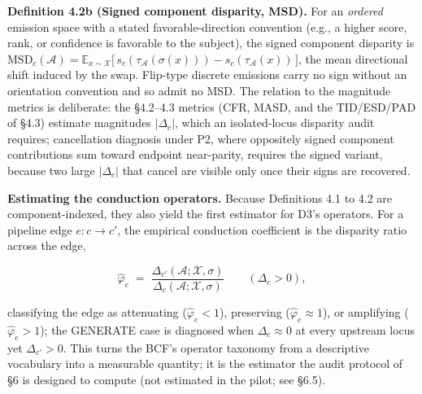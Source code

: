 \documentclass[acmsmall,nonacm]{acmart}
\begin{document}
\textbf{Definition 4.2b (Signed component disparity, MSD).} For an \emph{ordered} emission space with a stated favorable-direction convention (e.g., a higher score, rank, or confidence is favorable to the subject), the signed component disparity is $\mathrm{MSD}_c(\mathcal{A}) = \mathbb{E}_{x \sim \mathcal{X}} \big[\, s_c(\tau_{\mathcal{A}}(\sigma(x))) - s_c(\tau_{\mathcal{A}}(x)) \,\big]$, the mean directional shift induced by the swap. Flip-type discrete emissions carry no sign without an orientation convention and so admit no MSD. The relation to the magnitude metrics is deliberate: the \S{}4.2--4.3 metrics (CFR, MASD, and the TID/ESD/PAD of \S{}4.3) estimate magnitudes $|\Delta_c|$, which an isolated-locus disparity audit requires; cancellation diagnosis under P2, where oppositely signed component contributions sum toward endpoint near-parity, requires the signed variant, because two large $|\Delta_c|$ that cancel are visible only once their signs are recovered.

\textbf{Estimating the conduction operators.} Because Definitions 4.1 to 4.2 are component-indexed, they also yield the first estimator for D3's operators. For a pipeline edge $e: c \to c'$, the empirical conduction coefficient is the disparity ratio across the edge,

\begin{equation*}
\hat{\varphi}_e \;=\; \frac{\Delta_{c'}(\mathcal{A}; \mathcal{X}, \sigma)}{\Delta_c(\mathcal{A}; \mathcal{X}, \sigma)} \qquad (\Delta_c > 0),
\end{equation*}

classifying the edge as attenuating ($\hat{\varphi}_e < 1$), preserving ($\hat{\varphi}_e \approx 1$), or amplifying ($\hat{\varphi}_e > 1$); the GENERATE case is diagnosed when $\Delta_c \approx 0$ at every upstream locus yet $\Delta_{c'} > 0$. This turns the BCF's operator taxonomy from a descriptive vocabulary into a measurable quantity; it is the estimator the audit protocol of \S{}6 is designed to compute (not estimated in the pilot; see \S{}6.5).
\end{document}
